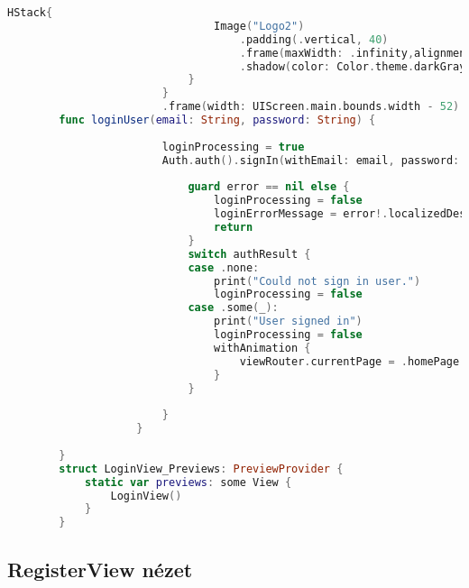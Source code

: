 \hspace{-10mm}
\begin{minipage}{\textwidth}
    \linespread{0.8}\selectfont
    \begin{lstlisting}[language=swift]
        HStack{
                                Image("Logo2")
                                    .padding(.vertical, 40)
                                    .frame(maxWidth: .infinity,alignment: .center)
                                    .shadow(color: Color.theme.darkGray.opacity(0.25), radius: 5, x: 0, y: 4)
                            }
                        }
                        .frame(width: UIScreen.main.bounds.width - 52)
        func loginUser(email: String, password: String) {
                        
                        loginProcessing = true
                        Auth.auth().signIn(withEmail: email, password: password) { authResult, error in
                            
                            guard error == nil else {
                                loginProcessing = false
                                loginErrorMessage = error!.localizedDescription
                                return
                            }
                            switch authResult {
                            case .none:
                                print("Could not sign in user.")
                                loginProcessing = false
                            case .some(_):
                                print("User signed in")
                                loginProcessing = false
                                withAnimation {
                                    viewRouter.currentPage = .homePage
                                }
                            }
                            
                        }
                    }
                    
        }
        struct LoginView_Previews: PreviewProvider {
            static var previews: some View {
                LoginView()
            }
        }
    \end{lstlisting}   
\end{minipage}


\subsection*{RegisterView nézet}

